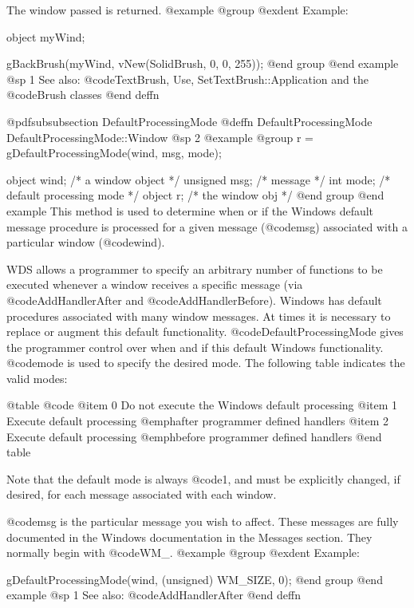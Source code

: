 The window passed is returned.
@example
@group
@exdent Example:

object  myWind;

gBackBrush(myWind, vNew(SolidBrush, 0, 0, 255));
@end group
@end example
@sp 1
See also:  @code{TextBrush, Use, SetTextBrush::Application}
        and the @code{Brush} classes
@end deffn












@pdfsubsubsection {DefaultProcessingMode}
@deffn {DefaultProcessingMode} DefaultProcessingMode::Window
@sp 2
@example
@group
r = gDefaultProcessingMode(wind, msg, mode);

object   wind;     /*  a window object          */
unsigned msg;      /*  message                  */
int      mode;     /*  default processing mode  */
object   r;        /*  the window obj           */
@end group
@end example
This method is used to determine when or if the Windows default message
procedure is processed for a given message (@code{msg}) associated with
a particular window (@code{wind}).

WDS allows a programmer to specify an arbitrary number of functions
to be executed whenever a window receives a specific message (via
@code{AddHandlerAfter} and @code{AddHandlerBefore}).  Windows has
default procedures associated with many window messages.  At times
it is necessary to replace or augment this default functionality.
@code{DefaultProcessingMode} gives the programmer control over when and
if this default Windows functionality.  @code{mode} is used to specify
the desired mode.  The following table indicates the valid modes:

@table @code
@item 0
Do not execute the Windows default processing
@item 1
Execute default processing @emph{after} programmer defined handlers
@item 2
Execute default processing @emph{before} programmer defined handlers
@end table

Note that the default mode is always @code{1}, and must be explicitly
changed, if desired, for each message associated with each window.

@code{msg} is the particular message you wish to affect.  These messages
are fully documented in the Windows documentation in the Messages
section.  They normally begin with @code{WM_}.
@example
@group
@exdent Example:

gDefaultProcessingMode(wind, (unsigned) WM_SIZE, 0);
@end group
@end example
@sp 1
See also:  @code{AddHandlerAfter}
@end deffn








